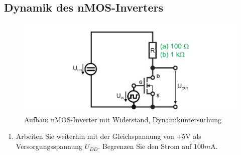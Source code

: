 \documentclass[10pt]{scrreprt}
\begin{document}
    \subsection{Dynamik des nMOS-Inverters}
    \begin{figure}[H]
        \includegraphics[width=\textwidth]{abb14.png}
        \caption{Aufbau: nMOS-Inverter mit Widerstand, Dynamikuntersuchung}
        \label{fig:abb14}
    \end{figure}
    \begin{enumerate}
        \item Arbeiten Sie weiterhin mit der Gleichspannung von $+5\si{\volt}$ als Versorgungsspannung
            $U_{DD}$. Begrenzen Sie den Strom auf $100\si{m\ampere}$.
    \end{enumerate}
\end{document}
